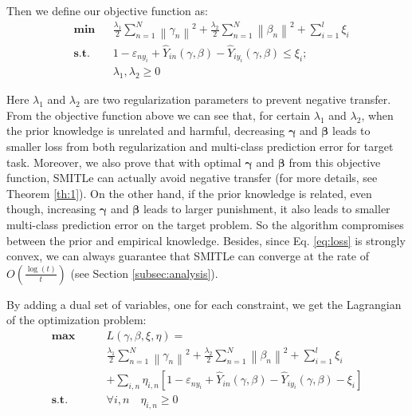 Then we define our objective function as:
\begin{equation}\label{eq:loss}
\begin{aligned}
& \textbf{min}
& & \frac{{{\lambda _1}}}{2}\sum\limits_{n = 1}^N {{{\left\| {{\gamma _n}} \right\|}^2}}  + \frac{{{\lambda _2}}}{2}\sum\limits_{n = 1}^N {{{\left\| {{\beta _n}} \right\|}^2}}  + \sum\limits_{i = 1}^l {{\xi _i}}   \\
& \textbf{s.t.}
& & 1 - {\varepsilon _{n{y_i}}} + {\hat Y_{in}}\left( {\gamma ,\beta } \right) - {\hat Y_{i{y_i}}}\left( {\gamma ,\beta } \right) \le {\xi_i};\\
& & &\lambda_1,\lambda_2 \ge 0
\end{aligned}
\end{equation}

Here $\lambda_1$ and $\lambda_2$ are two regularization parameters to prevent negative transfer. 
From the objective function above we can see that, for certain $\lambda_1$ and $\lambda_2$, when the prior knowledge is unrelated and harmful, decreasing $\boldsymbol{\gamma}$ and $\boldsymbol{\beta}$ leads to smaller loss from both regularization and multi-class prediction error for target task. Moreover, we also prove that with optimal $\boldsymbol{\gamma}$ and $\boldsymbol{\beta}$ from this objective function, SMITLe can actually avoid negative transfer (for more details, see Theorem \ref{th:1}). On the other hand, if the prior knowledge is related, even though, increasing $\boldsymbol{\gamma}$ and $\boldsymbol{\beta}$ leads to larger punishment, it also leads to smaller multi-class prediction error on the target problem. So the algorithm compromises between the prior and empirical knowledge. Besides, since Eq. \eqref{eq:loss} is strongly convex, we can always guarantee that SMITLe can converge at the rate of $O(\frac{\log(t)}{t})$ (see Section \ref{subsec:analysis}).


By adding a dual set of variables, one for each constraint, we get the Lagrangian of the optimization problem:
\begin{equation}\label{eq:dual}
\begin{aligned}
 \textbf{max}\qquad {}& L\left( {\gamma ,\beta ,\xi ,\eta } \right) =\\
 &\frac{{{\lambda _1}}}{2}\sum\limits_{n = 1}^N {{{\left\| {{\gamma _n}} \right\|}^2}}  + \frac{{{\lambda _2}}}{2}\sum\limits_{n = 1}^N {{{\left\| {{\beta _n}} \right\|}^2}}  + \sum\limits_{i = 1}^l {{\xi _i}} \\
   &+ \sum\limits_{i,n} {{\eta _{i,n}}\left[ {1 - {\varepsilon _{n{y_i}}} + {{\hat Y}_{in}}\left( {\gamma ,\beta } \right) - {{\hat Y}_{i{y_i}}}\left( {\gamma ,\beta } \right) - {\xi _i}} \right]}  \\
 \textbf{s.t.} \qquad {} & \forall i,n \quad {} {\eta _{i,n}} \ge 0
\end{aligned}
\end{equation}

